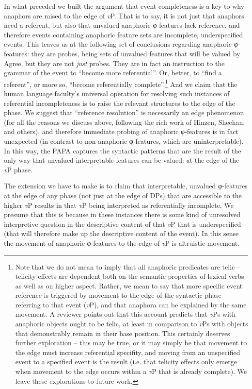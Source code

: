 \documentclass[output=paper
,modfonts
,nonflat
]{langsci/langscibook}
\begin{document}
In what preceded we built the argument that event completeness is a key to why anaphors are raised to the edge of \textit{v}P. That is to say, it is not just that anaphors need a referent, but also that unvalued anaphoric φ-features lack reference, and therefore events containing anaphoric feature sets are incomplete, underspecified events. This leaves us at the following set of conclusions regarding anaphoric φ-features: they are probes, being sets of unvalued features that will be valued by Agree, but they are not \textit{just} probes. They are in fact an instruction to the grammar of the event to ``become more referential''. Or, better, to ``find a referent'', or more so, ``become referentially complete''.{\footnote{Note that we do not mean to imply that all anaphoric predicates are telic -- telicity effects are dependent both on the semantic properties of lexical verbs as well as on higher aspect. Rather, we mean to say that more specific event reference is triggered by movement to the edge of the syntactic phase referring to that event (\textit{v}P), and that anaphora can be explained by the same movement. A reviewer points out that this account predicts that \textit{v}Ps with anaphoric objects ought to be telic, at least in comparison to \textit{v}Ps with objects that demonstrably remain in their base position. This certainly deserves further exploration -- this may be true, or it may simply be that movement to the edge must increase referential specifity, and moving from an unspecified event to a specified event is the result (i.e. that telicity effects only emerge when movement to the edge occurs within a \textit{v}P that is already complete). We leave these explorations to future work.}} And we claim that the human language faculty's universal operation for resolving such instances of referential incompleteness is to raise the relevant structures to the edge of the phase. We suggest that ``reference resolution'' is necessarily an edge phenomenon (for all the reasons we discuss above, following the rich work of Hinzen, Sheehan, and others), and therefore immediate probing of anaphoric φ-features is in fact unexpected (in contrast to non-anaphoric φ-features, which are uninterpretable). In this way, the PAPA captures the syntactic patterns that are the result of the only way that unvalued interpretable features can be valued: at the edge of the \textit{v}P phase.

The extension we have to make is to claim that interpretable, unvalued φ-features at the edge of any phase (not just at the edge of DPs) that are accessible to the higher \textit{v}P results in that \textit{v}P being interpreted as referentially incomplete. We presume that this is because in these instances there is some kind of unresolved interpretive question in the descriptive content of that \textit{v}P that is underspecified (that will therefore make up the descriptive content of the event). In this sense the movement of anaphoric φ-features to the edge of \textit{v}P is altruistic movement. 
\end{document}
